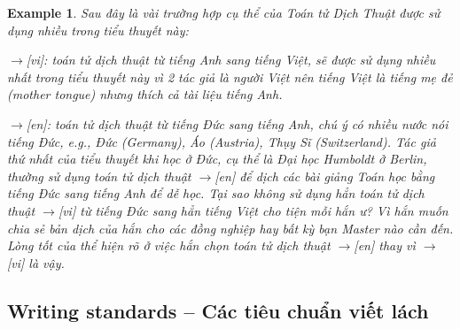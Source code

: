 \documentclass[12pt,oneside]{book}
\newtheorem{example}{Example}
\begin{document}
\begin{example}
	Sau đây là vài trường hợp cụ thể của Toán tử Dịch Thuật được sử dụng nhiều trong tiểu thuyết này:
	\item {\sf[en]$\to$[vi]}: toán tử dịch thuật từ tiếng Anh sang tiếng Việt, sẽ được sử dụng nhiều nhất trong tiểu thuyết này vì 2 tác giả là người Việt nên tiếng Việt là tiếng mẹ đẻ (mother tongue) nhưng thích cả tài liệu tiếng Anh.
	\item {\sf[de]$\to$[en]}: toán tử dịch thuật từ tiếng Đức sang tiếng Anh, chú ý có nhiều nước nói tiếng Đức, e.g., Đức (Germany), Áo (Austria), Thụy Sĩ (Switzerland). Tác giả thứ nhất của tiểu thuyết khi học ở Đức, cụ thể là Đại học Humboldt ở Berlin, thường sử dụng toán tử dịch thuật {\sf[de]$\to$[en]} để dịch các bài giảng Toán học bằng tiếng Đức sang tiếng Anh để dễ học. Tại sao không sử dụng hẳn toán tử dịch thuật {\sf[de]$\to$[vi]} từ tiếng Đức sang hẳn tiếng Việt cho tiện mỗi hắn ư? Vì hắn muốn chia sẻ bản dịch của hắn cho các đồng nghiệp hay bất kỳ bạn Master nào cần đến. Lòng tốt của {} thể hiện rõ ở việc hắn chọn toán tử dịch thuật {\sf[de]$\to$[en]} thay vì {\sf[de]$\to$[vi]} là vậy.
\end{example}


\subsection{Writing standards -- Các tiêu chuẩn viết lách}
\end{document}
